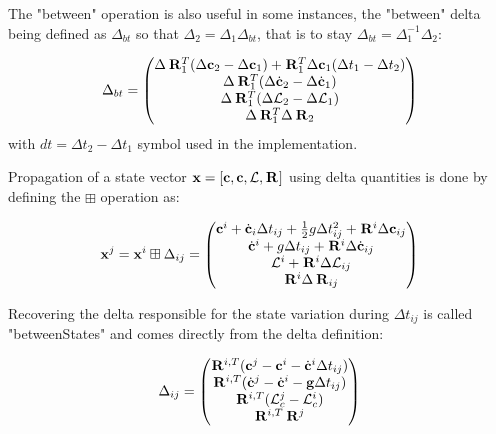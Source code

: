 \documentclass[11pt]{article}
\newcommand{\Rot}[2]{\prescript{#1}{}{\bfR}_{#2}}
\newcommand{\AM}{\mathcal{L}}
\newcommand{\COM}{\bfc}
\newcommand{\COMd}{\dot{\bfc}}
\begin{document}
The "between" operation is also useful in some instances, the "between" delta being defined as $\Delta_{bt}$ so that $\Delta_2 = \Delta_1 \Delta_{bt}$, that is to stay $\Delta_{bt} = \Delta^{-1}_1 \Delta_2$:

\begin{equation}
\Delta_{bt} = 
	\begin{pmatrix}
	\Delta \Rot{}{1}^T(\Delta \COM_2 - \Delta \COM_1) + \Rot{}{1}^T \Delta \COM_1 (\Delta t_1 - \Delta t_2)
	\\
	\Delta \Rot{}{1}^T(\Delta \COMd_2 - \Delta \COMd_1)
	\\
	\Delta \Rot{}{1}^T(\Delta \AM_2 - \Delta \AM_1)
	\\
	\Delta \Rot{}{1}^T \Delta \Rot{}{2}
	\end{pmatrix}
\end{equation}
with $dt = \Delta t_2 - \Delta t_1$ symbol used in the implementation.

Propagation of a state vector $\bfx = [\COM, \COM, \AM, \Rot{}{}]$ using delta quantities is done by defining the $\boxplus$ operation as:

\begin{equation}
	\bfx^j = \bfx^i \boxplus \Delta_{ij} =
	\begin{pmatrix}
	\COM^i + \COMd_i \Delta t_{ij} + \frac{1}{2} g \Delta t_{ij}^2 + \Rot{}{}^i \Delta \COM_{ij}
	\\
	\COMd^i + g \Delta t_{ij} + \Rot{}{}^i \Delta \COMd_{ij}
	\\
	\AM^i + \Rot{}{}^i \Delta \AM_{ij}
	\\
	\Rot{}{}^i \Delta \Rot{}{ij}
	\end{pmatrix}
\end{equation}

Recovering the delta responsible for the state variation during $\Delta t_{ij}$ is called "betweenStates" and comes directly from the delta definition:

\begin{equation}
\Delta_{ij} =
\begin{pmatrix}
	\Rot{}{}^{i,T} (\COM^j - \COM^i - \COMd{}{}^i \Delta t_{ij})
	\\
	\Rot{}{}^{i,T} (\COMd^{j} - \COMd^{i} - \bfg \Delta t_{ij})
	\\
	\Rot{}{}^{i,T} (\AM_c^{j} - \AM_c^{i})
	\\
\Rot{}{}^{i,T} \Rot{}{}^{j}
\end{pmatrix}
\end{equation}
\end{document}
